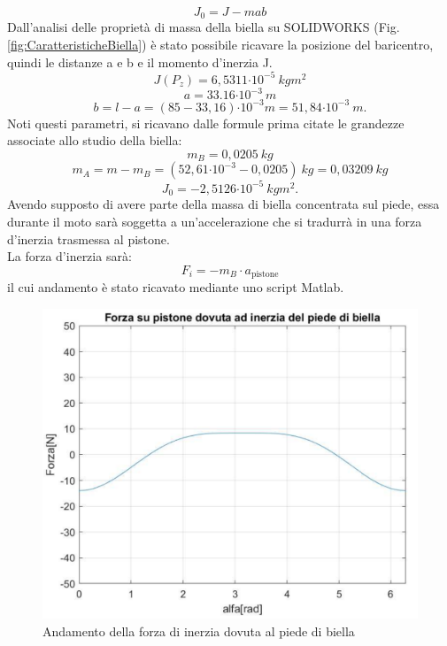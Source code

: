 \begin{equation}
    J_0=J-mab
\end{equation}
Dall’analisi delle proprietà di massa della biella su SOLIDWORKS (Fig.\ref{fig:CaratteristicheBiella}) è stato possibile ricavare la posizione del baricentro, quindi le distanze a e b e il momento d’inerzia J. 
\begin{equation}
    J\left(P_z\right)=6,5311{\cdot10}^{-5}\ kgm^2
\end{equation}
\begin{equation}
    a=33.16{\cdot10}^{-3}\ m
\end{equation}
\begin{equation}
    b=l-a=\left(85-33,16\right){\cdot10}^{-3}m=51,84{\cdot10}^{-3}\ m.
\end{equation}
Noti questi parametri, si ricavano dalle formule prima citate le grandezze associate allo studio della biella: 
\begin{equation}
    m_B=0,0205\ kg
\end{equation}
\begin{equation}
    m_A=m-m_B=\left(52,61{\cdot10}^{-3}-0,0205\right)\ kg=0,03209\ kg
\end{equation}
\begin{equation}
    J_0=-2,5126{\cdot10}^{-5}\ kgm^2.
\end{equation}
Avendo supposto di avere parte della massa di biella concentrata sul piede, essa durante il moto sarà soggetta a un’accelerazione che si tradurrà in una forza d’inerzia trasmessa al pistone.\\
La forza d’inerzia sarà: 
\begin{equation}
    F_i=-m_B\cdot a_{\mbox{pistone}}
\end{equation}
il cui andamento è stato ricavato mediante uno script Matlab.
\begin{figure}[h]
    \centering
    \includegraphics[scale=0.6]{Immagini/GraficoInerziaPiede.png}
    \caption{Andamento della forza di inerzia dovuta al piede di biella}
    \label{fig:GraficoInerziaPiede}
\end{figure}
